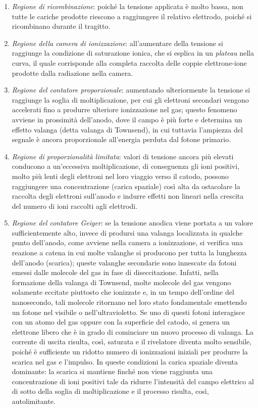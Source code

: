 \documentclass{report}
\numberwithin{equation}{section}
\numberwithin{figure}{section}
\begin{document}
\begin{enumerate}
    \item \emph{Regione di ricombinazione}: poiché la tensione applicata è molto bassa, non tutte le cariche prodotte riescono a raggiungere il relativo elettrodo, poiché si ricombinano durante il tragitto.
    \item \emph{Regione della camera di ionizzazione}: all'aumentare della tensione si raggiunge la condizione di saturazione ionica, che si esplica in un \textit{plateau} nella curva, il quale corrisponde alla completa raccolta delle coppie elettrone-ione prodotte dalla radiazione nella camera.
    \item \emph{Regione del contatore proporzionale}: aumentando ulteriormente la tensione si raggiunge la soglia di moltiplicazione, per cui gli elettroni secondari vengono accelerati fino a produrre ulteriore ionizzazione nel gas; questo fenomeno avviene in prossimità dell'anodo, dove il campo è più forte e determina un effetto valanga (detta valanga di Townsend), in cui tuttavia l’ampiezza del segnale è ancora proporzionale all'energia perduta dal fotone primario.
    \item \emph{Regione di proporzionalità limitata}: valori di tensione ancora più elevati conducono a un'eccessiva moltiplicazione, di conseguenza gli ioni positivi, molto più lenti degli elettroni nel loro viaggio verso il catodo, possono raggiungere una concentrazione (carica spaziale) così alta da ostacolare la raccolta degli elettroni sull'anodo e indurre effetti non lineari nella crescita del numero di ioni raccolti agli elettrodi.
    \item \emph{Regione del contatore Geiger}: se la tensione anodica viene portata a un valore sufficientemente alto, invece di prodursi una valanga localizzata in qualche punto dell'anodo, come avviene nella camera a ionizzazione, si verifica una reazione a catena in cui molte valanghe si producono per tutta la lunghezza dell'anodo (scarica); queste valanghe secondarie sono innescate da fotoni emessi dalle molecole del gas in fase di diseccitazione. Infatti, nella formazione della valanga di Townsend, molte molecole del gas vengono solamente eccitate piuttosto che ionizzate e, in un tempo dell'ordine del nanosecondo, tali molecole ritornano nel loro stato fondamentale emettendo un fotone nel visibile o nell'ultravioletto. Se uno di questi fotoni interagisce con un atomo del gas oppure con la superficie del catodo, si genera un elettrone libero che è in grado di cominciare un nuovo processo di valanga. La corrente di uscita risulta, così, saturata e il rivelatore diventa molto sensibile, poiché è sufficiente un ridotto numero di ionizzazioni iniziali per produrre la scarica nel gas e l’impulso. In queste condizioni la carica spaziale diventa dominante: la scarica si mantiene finché non viene raggiunta una concentrazione di ioni positivi tale da ridurre l’intensità del campo elettrico al di sotto della soglia di moltiplicazione e il processo risulta, così, autolimitante.
\end{enumerate}
\end{document}
